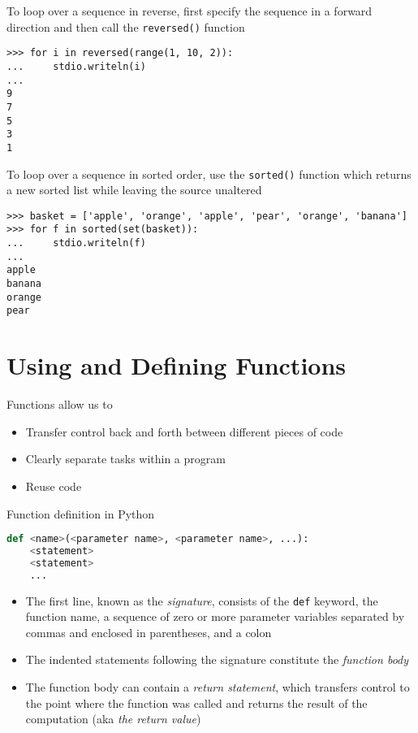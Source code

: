 \documentclass[8pt,a4paper,compress]{beamer}
\begin{document}
\begin{frame}[fragile]
To loop over a sequence in reverse, first specify the sequence in a forward direction and then call the \lstinline{reversed()} function
\begin{lstlisting}[language={}]
>>> for i in reversed(range(1, 10, 2)):
...     stdio.writeln(i)
...
9
7
5
3
1
\end{lstlisting}

\bigskip

To loop over a sequence in sorted order, use the \lstinline{sorted()} function which returns a new sorted list while leaving the source unaltered
\begin{lstlisting}[language={}]
>>> basket = ['apple', 'orange', 'apple', 'pear', 'orange', 'banana']
>>> for f in sorted(set(basket)):
...     stdio.writeln(f)
...
apple
banana
orange
pear
\end{lstlisting}
\end{frame}

\section{Using and Defining Functions}
\begin{frame}[fragile]
Functions allow us to
\begin{itemize}
\item Transfer control back and forth between different pieces of code 
\item Clearly separate tasks within a program
\item Reuse code
\end{itemize}

\bigskip

Function definition in Python
\begin{lstlisting}[language=Python]
def <name>(<parameter name>, <parameter name>, ...):
    <statement>
    <statement>
    ...
\end{lstlisting}

\begin{itemize}
\item The first line, known as the \emph{signature}, consists of the \lstinline{def} keyword, the function name, a sequence of zero or more parameter variables separated by commas and enclosed in parentheses, and a colon

\item The indented statements following the signature constitute the \emph{function body}

\item The function body can contain a \emph{return statement}, which transfers control to the point where the function was called and returns the result of the computation (aka \emph{the return value})
\end{itemize}
\end{frame}
\end{document}
